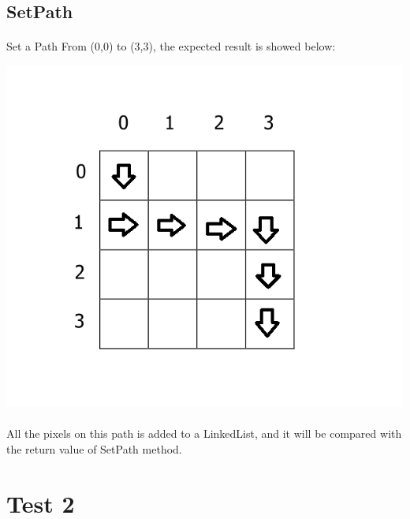 \documentclass[11pt, a4paper]{report}
\begin{document}
\subsection{SetPath}
\paragraph{}Set a Path From (0,0) to (3,3), the expected result is showed below:\\
\begin{center}
\includegraphics[scale=0.4]{./image/Test1SetPath.png}
\end{center}
\paragraph{}All the pixels on this path is added to a LinkedList, and it will be compared with the return value of SetPath method.



\section{Test 2}
\end{document}
